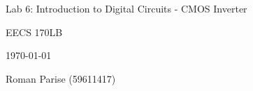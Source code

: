 \centering
\vspace{2.5cm}
{\huge Lab 6: Introduction to Digital Circuits - CMOS Inverter \par}
{\Large EECS 170LB \par}
{\Large \today \par}
\vspace{1cm}
{\large Roman Parise (59611417) \par}
\vspace{1cm}
